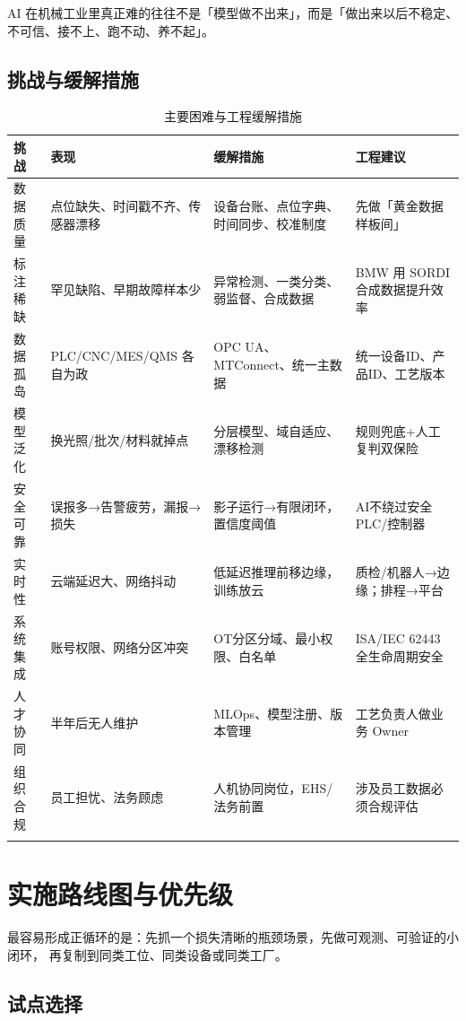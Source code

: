 \documentclass[a4paper,12pt]{ctexart}
\begin{document}
AI 在机械工业里真正难的往往不是「模型做不出来」，而是「做出来以后不稳定、
不可信、接不上、跑不动、养不起」。

\subsection{挑战与缓解措施}

\begin{longtable}{p{2.5cm}p{4.5cm}p{4.5cm}p{3.5cm}}
\toprule
\textbf{挑战} & \textbf{表现} & \textbf{缓解措施} & \textbf{工程建议} \\
\midrule
\endhead
数据质量 & 点位缺失、时间戳不齐、传感器漂移 & 设备台账、点位字典、时间同步、校准制度 & 先做「黄金数据样板间」 \\
标注稀缺 & 罕见缺陷、早期故障样本少 & 异常检测、一类分类、弱监督、合成数据 & BMW 用 SORDI 合成数据提升效率 \\
数据孤岛 & PLC/CNC/MES/QMS 各自为政 & OPC UA、MTConnect、统一主数据 & 统一设备ID、产品ID、工艺版本 \\
模型泛化 & 换光照/批次/材料就掉点 & 分层模型、域自适应、漂移检测 & 规则兜底+人工复判双保险 \\
安全可靠 & 误报多→告警疲劳，漏报→损失 & 影子运行→有限闭环，置信度阈值 & AI不绕过安全 PLC/控制器 \\
实时性 & 云端延迟大、网络抖动 & 低延迟推理前移边缘，训练放云 & 质检/机器人→边缘；排程→平台 \\
系统集成 & 账号权限、网络分区冲突 & OT分区分域、最小权限、白名单 & ISA/IEC 62443 全生命周期安全 \\
人才协同 & 半年后无人维护 & MLOps、模型注册、版本管理 & 工艺负责人做业务 Owner \\
组织合规 & 员工担忧、法务顾虑 & 人机协同岗位，EHS/法务前置 & 涉及员工数据必须合规评估 \\
\bottomrule
\caption{主要困难与工程缓解措施}
\end{longtable}

\section{实施路线图与优先级}

最容易形成正循环的是：先抓一个损失清晰的瓶颈场景，先做可观测、可验证的小闭环，
再复制到同类工位、同类设备或同类工厂。

\subsection{试点选择}
\end{document}
